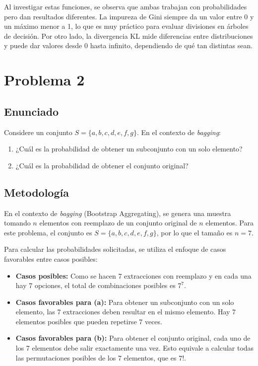 \documentclass{article}
\begin{document}
Al investigar estas funciones, se observa que ambas trabajan con probabilidades pero dan resultados diferentes. La impureza de Gini siempre da un valor entre 0 y un máximo menor a 1, lo que es muy práctico para evaluar divisiones en árboles de decisión. Por otro lado, la divergencia KL mide diferencias entre distribuciones y puede dar valores desde 0 hasta infinito, dependiendo de qué tan distintas sean.

\section{Problema 2}

\subsection{Enunciado}

Considere un conjunto $S = \{a, b, c, d, e, f, g\}$. En el contexto de \textit{bagging}:

\begin{enumerate}
    \item[(a)] ¿Cuál es la probabilidad de obtener un subconjunto con un solo elemento?
    \item[(b)] ¿Cuál es la probabilidad de obtener el conjunto original?
\end{enumerate}

\subsection{Metodología}

En el contexto de \textit{bagging} (Bootstrap Aggregating), se genera una muestra tomando $n$ elementos con reemplazo de un conjunto original de $n$ elementos. Para este problema, el conjunto es $S = \{a, b, c, d, e, f, g\}$, por lo que el tamaño es $n = 7$. 

Para calcular las probabilidades solicitadas, se utiliza el enfoque de casos favorables entre casos posibles:
\begin{itemize}
    \item \textbf{Casos posibles:} Como se hacen 7 extracciones con reemplazo y en cada una hay 7 opciones, el total de combinaciones posibles es $7^7$.
    \item \textbf{Casos favorables para (a):} Para obtener un subconjunto con un solo elemento, las 7 extracciones deben resultar en el mismo elemento. Hay 7 elementos posibles que pueden repetirse 7 veces.
    \item \textbf{Casos favorables para (b):} Para obtener el conjunto original, cada uno de los 7 elementos debe salir exactamente una vez. Esto equivale a calcular todas las permutaciones posibles de los 7 elementos, que es $7!$.
\end{itemize}
\end{document}
